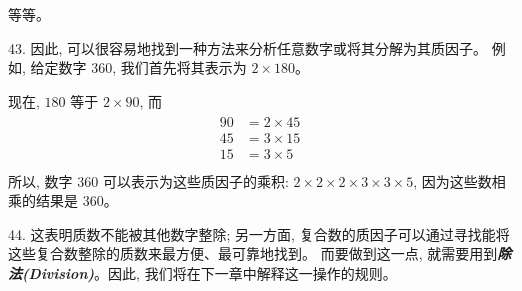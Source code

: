 等等。
\par
43. 因此, 可以很容易地找到一种方法来分析任意数字或将其分解为其质因子。
例如, 给定数字 $360$, 我们首先将其表示为 $2 \times 180$。\par
现在, $180$ 等于 $2 \times 90$, 而  
\begin{gather*}
	\begin{aligned}
		90 &= 2 \times 45 \\
		45 &= 3 \times 15 \\
		15 &= 3 \times 5 \\
	\end{aligned}
\end{gather*}
所以, 数字 $360$ 可以表示为这些质因子的乘积: $2 \times 2 \times 2 \times 3 \times 3 \times 5$, 
因为这些数相乘的结果是 $360$。

44. 这表明质数不能被其他数字整除; 
另一方面, 复合数的质因子可以通过寻找能将这些复合数整除的质数来最方便、最可靠地找到。
而要做到这一点, 就需要用到\textbf{\textit{除法(Division)}}。因此, 我们将在下一章中解释这一操作的规则。

